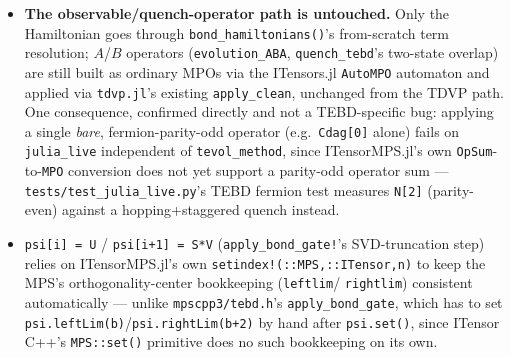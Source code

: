 \documentclass[11pt]{article}
\begin{document}
\begin{itemize}
    This is a deliberate, confirmed-necessary choice, not a stylistic
    one: real ITensors.jl's builtin \texttt{"Fermion"} site type
    (\texttt{ITensors/src/lib/SiteTypes/src/sitetypes/fermion.jl}) only
    defines \lstinline|op("C",..)|/\lstinline|op("Cdag",..)|/
    \lstinline|op("F",..)| --- there is no \texttt{"A"/"Adag"} operator
    registered for it at all, unlike dmrgpy's own hand-rolled
    pyitensor/C++ site tables, which do define \texttt{"A"/"Adag"} as
    their own name for the bare, string-free annihilation/creation
    operator (exactly what ITensors.jl's \texttt{"C"}/\texttt{"Cdag"}
    already are --- the Jordan-Wigner string is inserted separately, by
    the automaton or, here, by \lstinline|term_add!|/\lstinline|resolve_term|'s
    own carry tracking, never baked into the operator itself on either
    side). So on this backend, unlike the other two (where the
    equivalent carry-tracking pass is mostly an inert no-op over
    already-dressed input), the Jordan-Wigner carry logic does the
    actual string threading.
  \item \textbf{The observable/quench-operator path is untouched.} Only
    the Hamiltonian goes through \lstinline|bond_hamiltonians()|'s
    from-scratch term resolution; $A$/$B$ operators
    (\lstinline|evolution_ABA|, \lstinline|quench_tebd|'s two-state
    overlap) are still built as ordinary MPOs via the ITensors.jl
    \lstinline|AutoMPO| automaton and applied via \texttt{tdvp.jl}'s
    existing \lstinline|apply_clean|, unchanged from the TDVP path. One
    consequence, confirmed directly and not a TEBD-specific bug:
    applying a single \emph{bare}, fermion-parity-odd operator (e.g.\
    \lstinline|Cdag[0]| alone) fails on \lstinline|julia_live|
    independent of \lstinline|tevol_method|, since ITensorMPS.jl's own
    \lstinline|OpSum|-to-\lstinline|MPO| conversion does not yet support
    a parity-odd operator sum --- \texttt{tests/test\_julia\_live.py}'s
    TEBD fermion test measures \lstinline|N[2]| (parity-even) against a
    hopping+staggered quench instead.
  \item \lstinline|psi[i] = U| / \lstinline|psi[i+1] = S*V|
    (\lstinline|apply_bond_gate!|'s SVD-truncation step) relies on
    ITensorMPS.jl's own \lstinline|setindex!(::MPS,::ITensor,n)| to keep
    the MPS's orthogonality-center bookkeeping (\lstinline|leftlim|/
    \lstinline|rightlim|) consistent automatically --- unlike
    \texttt{mpscpp3/tebd.h}'s \lstinline|apply_bond_gate|, which has to
    set \lstinline|psi.leftLim(b)|/\lstinline|psi.rightLim(b+2)| by hand
    after \lstinline|psi.set()|, since ITensor C++'s \lstinline|MPS::set()|
    primitive does no such bookkeeping on its own.
\end{itemize}
\end{document}
